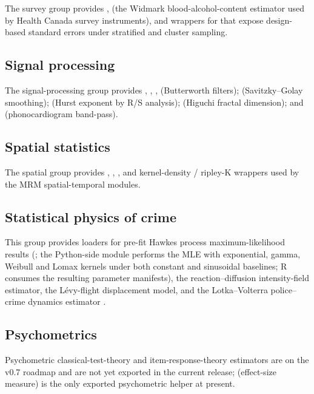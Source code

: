 \documentclass[article,shortnames,nojss]{jss}
\begin{document}
The survey group provides ,
 (the Widmark blood-alcohol-content
estimator used by Health Canada survey instruments), and wrappers
for  that expose design-based standard errors under
stratified and cluster sampling.

\subsection{Signal processing}

The signal-processing group provides ,
, ,  (Butterworth
filters);  (Savitzky--Golay smoothing);
 (Hurst exponent by R/S analysis);
 (Higuchi fractal dimension); and 
(phonocardiogram band-pass).

\subsection{Spatial statistics}

The spatial group provides ,
,
, and kernel-density / ripley-K wrappers used by
the MRM spatial-temporal modules.

\subsection{Statistical physics of crime}

This group provides loaders for pre-fit Hawkes process maximum-likelihood
results (; the Python-side
 module performs the MLE with
exponential, gamma, Weibull and Lomax kernels under both constant and
sinusoidal baselines; R consumes the resulting parameter manifests),
the reaction--diffusion intensity-field estimator, the L\'evy-flight
displacement model, and the Lotka--Volterra police--crime dynamics
estimator \citep{Mohler2011, Ruhela2026Hawkes}.

\subsection{Psychometrics}

Psychometric classical-test-theory and item-response-theory
estimators are on the v0.7 roadmap and are not yet exported in the
current release;  (effect-size measure) is the
only exported psychometric helper at present.
\end{document}

